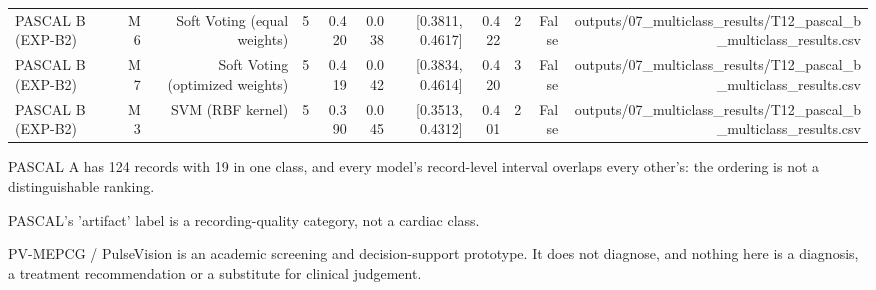 \begin{table}[htbp]
\begin{tabular}{lrrrrrrrrrr}
    PASCAL B (EXP-B2) & M6 & Soft Voting (equal weights) & 5 & 0.420 & 0.038 & [0.3811, 0.4617] & 0.422 & 2 & False & outputs/07\_multiclass\_results/T12\_pascal\_b\_multiclass\_results.csv \\
    PASCAL B (EXP-B2) & M7 & Soft Voting (optimized weights) & 5 & 0.419 & 0.042 & [0.3834, 0.4614] & 0.420 & 3 & False & outputs/07\_multiclass\_results/T12\_pascal\_b\_multiclass\_results.csv \\
    PASCAL B (EXP-B2) & M3 & SVM (RBF kernel) & 5 & 0.390 & 0.045 & [0.3513, 0.4312] & 0.401 & 2 & False & outputs/07\_multiclass\_results/T12\_pascal\_b\_multiclass\_results.csv \\
    \bottomrule
  \end{tabular}
  \par\footnotesize PASCAL A has 124 records with 19 in one class, and every model's record-level interval overlaps every other's: the ordering is not a distinguishable ranking.
  \par\footnotesize PASCAL's 'artifact' label is a recording-quality category, not a cardiac class.
  \par\footnotesize PV-MEPCG / PulseVision is an academic screening and decision-support prototype. It does not diagnose, and nothing here is a diagnosis, a treatment recommendation or a substitute for clinical judgement.
\end{table}
